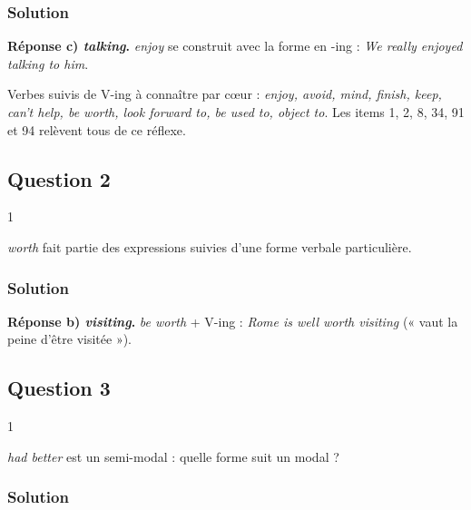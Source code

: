 \documentclass[11pt,a4paper]{article}
\begin{document}
\hypertarget{solution}{%
\subsubsection{Solution}\label{solution}}

\textbf{Réponse c) \emph{talking}.} \emph{enjoy} se construit avec la forme en -ing : \emph{We really enjoyed talking to him}.

\begin{methode}

Verbes suivis de V-ing à connaître par cœur : \emph{enjoy, avoid, mind, finish, keep, can't help, be worth, look forward to, be used to, object to}. Les items 1, 2, 8, 34, 91 et 94 relèvent tous de ce réflexe.

\end{methode}

\hypertarget{question-2}{%
\subsection{Question 2}\label{question-2}}

\begin{indication}{1}

\emph{worth} fait partie des expressions suivies d'une forme verbale particulière.

\end{indication}

\hypertarget{solution-1}{%
\subsubsection{Solution}\label{solution-1}}

\textbf{Réponse b) \emph{visiting}.} \emph{be worth} + V-ing : \emph{Rome is well worth visiting} (« vaut la peine d'être visitée »).

\hypertarget{question-3}{%
\subsection{Question 3}\label{question-3}}

\begin{indication}{1}

\emph{had better} est un semi-modal : quelle forme suit un modal ?

\end{indication}

\hypertarget{solution-2}{%
\subsubsection{Solution}\label{solution-2}}
\end{document}
